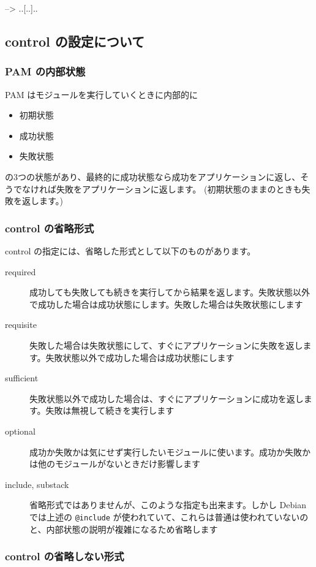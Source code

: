 \documentclass[mingoth,a4paper]{jsarticle}
\begin{document}
\begin{commandline}
[..[..\]..]    -->   ..[..]..
\end{commandline}
\subsection{control の設定について}
\label{sec-1-4}
\subsubsection{PAM の内部状態}
\label{sec-1-4-1}

PAM はモジュールを実行していくときに内部的に
\begin{itemize}
\item 初期状態
\item 成功状態
\item 失敗状態
\end{itemize}
の3つの状態があり、最終的に成功状態なら成功をアプリケーションに返し、そうでなければ失敗をアプリケーションに返します。
(初期状態のままのときも失敗を返します。)
\subsubsection{control の省略形式}
\label{sec-1-4-2}

control の指定には、省略した形式として以下のものがあります。

\begin{description}
\item[required] 成功しても失敗しても続きを実行してから結果を返します。失敗状態以外で成功した場合は成功状態にします。失敗した場合は失敗状態にします
\item[requisite] 失敗した場合は失敗状態にして、すぐにアプリケーションに失敗を返します。失敗状態以外で成功した場合は成功状態にします
\item[sufficient] 失敗状態以外で成功した場合は、すぐにアプリケーションに成功を返します。失敗は無視して続きを実行します
\item[optional] 成功か失敗かは気にせず実行したいモジュールに使います。成功か失敗かは他のモジュールがないときだけ影響します
\item[include, substack] 省略形式ではありませんが、このような指定も出来ます。しかし Debian では上述の \verb~@include~ が使われていて、これらは普通は使われていないのと、内部状態の説明が複雑になるため省略します
\end{description}
\subsubsection{control の省略しない形式}
\label{sec-1-4-3}
\end{document}
